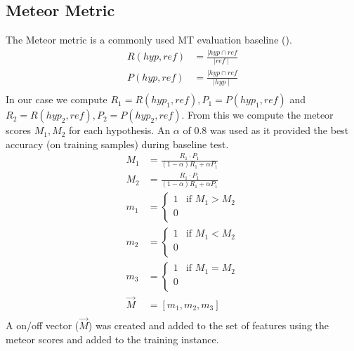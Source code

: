 \documentclass[11pt]{article}
\begin{document}
\subsection{Meteor Metric}
The Meteor metric is a commonly used MT evaluation baseline
(\cite{koehn2010statistical}).
\begin{align*}
R(hyp,ref) &= \frac{\mid hyp \cap ref}{\mid ref \mid}\\
P(hyp,ref) &= \frac{\mid hyp \cap ref}{\mid hyp \mid}\\
\end{align*}
In our case we compute $R_1 = R(hyp_1, ref), P_1 = P(hyp_1,ref)$ and $R_2 =
R(hyp_2, ref), P_2 = P(hyp_2, ref)$. From this we compute the meteor scores
$M_1,M_2$ for each hypothesis. An $\alpha$ of 0.8 was used as it provided the
best accuracy (on training samples) during baseline test.
\begin{align*}
M_1 &= \frac{R_1 \cdot P_1}{(1-\alpha)R_1 + \alpha P_1}\\
M_2 &= \frac{R_1 \cdot P_1}{(1-\alpha)R_1 + \alpha P_1}\\
m_1 &= \begin{cases} 1 &\mbox{if } M_1 > M_2\\
0\\
\end{cases}\\
m_2 &= \begin{cases} 1 &\mbox{if } M_1 < M_2\\
0\\
\end{cases}\\
m_3 &= \begin{cases} 1 &\mbox{if } M_1 = M_2\\
0\\
\end{cases}\\
\vec{M} &= [m_1, m_2, m_3]\\
\end{align*}
A on/off vector ($\vec{M}$) was created and added to the set of features using
the meteor scores and added to the training instance. 
\end{document}
